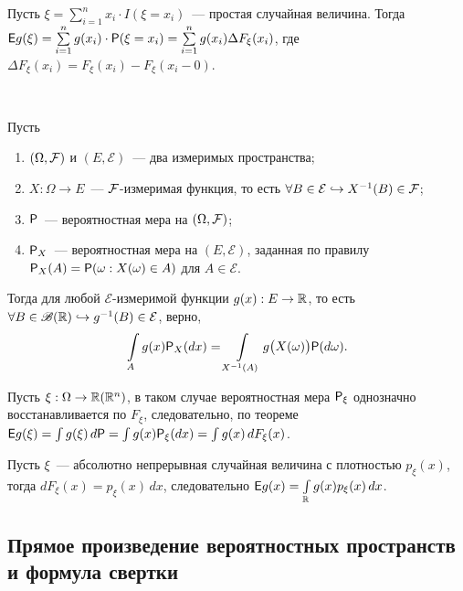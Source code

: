 Пусть $\xi = \sum\limits_{i = 1}^n x_i \cdot I (\xi = x_i)$~--- простая случайная величина. Тогда $\E g(\xi) = \sum\limits_{i=1}^{n} g(x_i) \cdot \P(\xi = x_i) = \sum\limits_{i = 1}^n g(x_i) \Delta F_\xi (x_i)$, где $\Delta F_\xi(x_i) = F_\xi(x_i) - F_\xi (x_i - 0)$.

\begin{theorem}~

	Пусть 
	\begin{enumerate}
	    \item $(\Omega, \F)$ и $(E, \mathcal{E})$~--- два измеримых пространства;
	    \item $X : \Omega \rightarrow E$~--- $\F$-измеримая функция, то есть $\forall B \in \mathcal{E} \hookrightarrow X^{-1}(B) \in \F$;
	    \item $\P$~--- вероятностная мера на $(\Omega, \F)$;
	    \item $\P_X$~--- вероятностная мера на $(E, \mathcal{E})$, заданная по правилу $\P_X(A) = \P (\omega: X(\omega) \in A)$ для $A \in \mathcal{E}$.
	\end{enumerate}
	
	Тогда для любой $\mathcal{E}$-измеримой функции $g(x):E \rightarrow \R$, то есть $\forall B \in \B(\R) \hookrightarrow g^{-1}(B) \in \mathcal{E}$, верно, 
	$$\int\limits_A g(x) \P_X(dx) = \int\limits_{X^{-1}(A)} g\big( X(\omega) \big) \P(d \omega).$$
\end{theorem}

\begin{consequence}[1]
    Пусть $\xi : \Omega \rightarrow \R (\R^n)$, в таком случае вероятностная мера $\P_\xi$ однозначно восстанавливается по $F_\xi$, следовательно, по теореме $\E g(\xi) = \int g(\xi) \, d\P = \int g(x) \P_\xi(dx) = \int g(x) \, d F_\xi (x)$.
\end{consequence}
\begin{consequence}[2]
    Пусть  $\xi$~--- абсолютно непрерывная случайная величина с плотностью $p_\xi(x)$, тогда $d F_\xi (x) = p_\xi (x) \, dx$, следовательно $\E g(x) = \int\limits_{\R} g(x) p_\xi(x) \, d x$.
\end{consequence}

\subsection{Прямое произведение вероятностных пространств и формула свертки}

